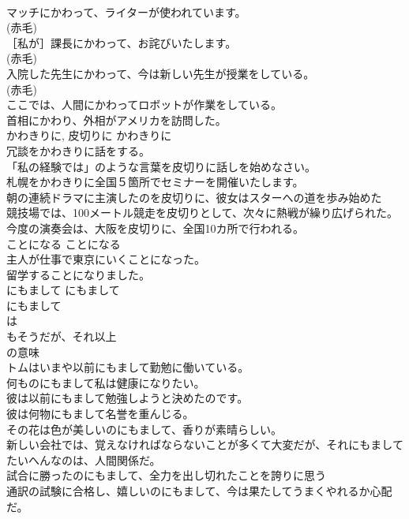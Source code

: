 \documentclass[8pt]{extreport}
\begin{document}
\begin{CJK}{UTF8}{min}
\\	マッチにかわって、ライターが使われています。  
\\	(赤毛)
\\	［私が］課長にかわって、お詫びいたします。  
\\	(赤毛)
\\	入院した先生にかわって、今は新しい先生が授業をしている。  
\\	(赤毛)
\\	ここでは、人間にかわってロボットが作業をしている。   
\\	首相にかわり、外相がアメリカを訪問した。  
\\	かわきりに, 皮切りに	かわきりに	
\\	冗談をかわきりに話をする。  
\\	「私の経験では」のような言葉を皮切りに話しを始めなさい。  
\\	札幌をかわきりに全国５箇所でセミナーを開催いたします。  
\\	朝の連続ドラマに主演したのを皮切りに、彼女はスターへの道を歩み始めた  
\\	競技場では、100メートル競走を皮切りとして、次々に熱戦が繰り広げられた。  
\\	今度の演奏会は、大阪を皮切りに、全国10カ所で行われる。   
\\	ことになる	ことになる	
\\	主人が仕事で東京にいくことになった。   
\\	留学することになりました。   
\\	にもまして	にもまして	
\\	にもまして
\\	は
\\	もそうだが、それ以上
\\	の意味	
\\	トムはいまや以前にもまして勤勉に働いている。   
\\	何ものにもまして私は健康になりたい。   
\\	彼は以前にもまして勉強しようと決めたのです。   
\\	彼は何物にもまして名誉を重んじる。  
\\	その花は色が美しいのにもまして、香りが素晴らしい。  
\\	新しい会社では、覚えなければならないことが多くて大変だが、それにもましてたいへんなのは、人間関係だ。  
\\	試合に勝ったのにもまして、全力を出し切れたことを誇りに思う   
\\	通訳の試験に合格し、嬉しいのにもまして、今は果たしてうまくやれるか心配だ。   

\end{CJK}
\end{document}
